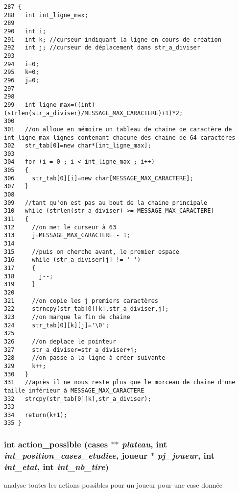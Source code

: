 \begin{Code}\begin{verbatim}287 {
288   int int_ligne_max;
289   
290   int i;
291   int k; //curseur indiquant la ligne en cours de création
292   int j; //curseur de déplacement dans str_a_diviser
293 
294   i=0;
295   k=0;
296   j=0;
297 
298 
299   int_ligne_max=((int)(strlen(str_a_diviser)/MESSAGE_MAX_CARACTERE)+1)*2;
300   
301   //on alloue en mémoire un tableau de chaine de caractère de int_ligne_max lignes contenant chacune des chaine de 64 caractères
302   str_tab[0]=new char*[int_ligne_max];
303   
304   for (i = 0 ; i < int_ligne_max ; i++)
305   {
306     str_tab[0][i]=new char[MESSAGE_MAX_CARACTERE];
307   }
308   
309   //tant qu'on est pas au bout de la chaine principale
310   while (strlen(str_a_diviser) >= MESSAGE_MAX_CARACTERE)
311   {
312     //on met le curseur à 63
313     j=MESSAGE_MAX_CARACTERE - 1;
314     
315     //puis on cherche avant, le premier espace
316     while (str_a_diviser[j] != ' ')
317     {
318       j--;
319     }
320     
321     //on copie les j premiers caractères
322     strncpy(str_tab[0][k],str_a_diviser,j);
323     //on marque la fin de chaine
324     str_tab[0][k][j]='\0';
325     
326     //on deplace le pointeur
327     str_a_diviser=str_a_diviser+j;
328     //on passe a la ligne à créer suivante
329     k++;
330   }
331   //après il ne nous reste plus que le morceau de chaine d'une taille inférieur à MESSAGE_MAX_CARACTERE
332   strcpy(str_tab[0][k],str_a_diviser);
333   
334   return(k+1);
335 }
\end{verbatim}\end{Code}


\subsubsection{\setlength{\rightskip}{0pt plus 5cm}int action\_\-possible ({\bf cases} $\ast$$\ast$ {\em plateau}, int {\em int\_\-position\_\-cases\_\-etudiee}, {\bf joueur} $\ast$ {\em pj\_\-joueur}, int {\em int\_\-etat}, int {\em int\_\-nb\_\-tire})}\label{outils_8c_d1c532cdedd8b070691946cc83436c96}


analyse toutes les actions possibles pour un joueur pour une case donn\'{e}e 


